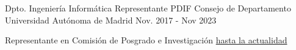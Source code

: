 


\begin{cventries}
  \cventry
    {Dpto. Ingeniería Informática} %
    {Representante PDIF Consejo de Departamento} %
    {Universidad Autónoma de Madrid} %
    {Nov. 2017 - Nov 2023} %
    { \begin{cvitems} %
      	\item {Representante en Comisión de Posgrado e Investigación \underline{hasta la actualidad}}
      \end{cvitems}
    }
\end{cventries}


